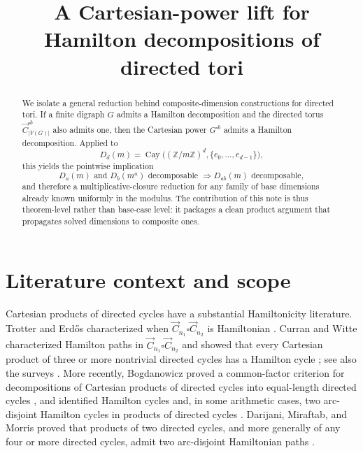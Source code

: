\documentclass[11pt]{article}
\title{A Cartesian-power lift for Hamilton decompositions of directed tori}
\author{}
\date{}
\theoremstyle{remark}
\newcommand{\Cay}{\operatorname{Cay}}
\newcommand{\torus}[2]{D_{#1}(#2)}
\begin{document}
\maketitle

\begin{abstract}
We isolate a general reduction behind composite-dimension constructions for directed tori.
If a finite digraph $G$ admits a Hamilton decomposition and the directed torus
$\vec C_{|V(G)|}^{\square b}$ also admits one, then the Cartesian power $G^{\square b}$ admits a
Hamilton decomposition.
Applied to
\[
\torus{d}{m}=\Cay\bigl((\mathbb Z/m\mathbb Z)^d,\{e_0,\dots,e_{d-1}\}\bigr),
\]
this yields the pointwise implication
\[
\torus{a}{m}\text{ and }\torus{b}{m^a}\text{ decomposable }\Longrightarrow \torus{ab}{m}\text{ decomposable},
\]
and therefore a multiplicative-closure reduction for any family of base dimensions already known uniformly in the modulus.
The contribution of this note is thus theorem-level rather than base-case level: it packages a clean product argument that propagates solved dimensions to composite ones.
\end{abstract}

\section{Literature context and scope}
Cartesian products of directed cycles have a substantial Hamiltonicity literature.
Trotter and Erd\H{o}s characterized when $\vec C_{n_1}\square \vec C_{n_2}$ is Hamiltonian \cite{TrotterErdos1978}.
Curran and Witte characterized Hamilton paths in $\vec C_{n_1}\square \vec C_{n_2}$ and showed that every Cartesian product of three or more nontrivial directed cycles has a Hamilton cycle \cite{CurranWitte1985}; see also the surveys \cite{CurranGallian1996,LanelPallageRatnayakeThevashaWelihinda2019}.
More recently, Bogdanowicz proved a common-factor criterion for decompositions of Cartesian products of directed cycles into equal-length directed cycles \cite{Bogdanowicz2017}, and identified Hamilton cycles and, in some arithmetic cases, two arc-disjoint Hamilton cycles in products of directed cycles \cite{Bogdanowicz2020}.
Darijani, Miraftab, and Morris proved that products of two directed cycles, and more generally of any four or more directed cycles, admit two arc-disjoint Hamiltonian paths \cite{DarijaniMiraftabMorris2025}.
\end{document}
